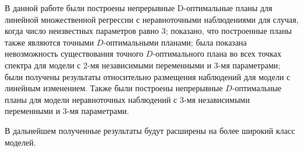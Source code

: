 В данной работе были построены непрерывные D-оптимальные планы для линейной множественной регрессии с неравноточными наблюдениями для случая, когда число неизвестных параметров равно 3; показано, что построенные планы также являются точными $D$-оптимальными планами; была показана невозможность существования точного $D$-оптимального плана во всех точках спектра для модели с 2-мя независимыми переменными и 3-мя параметрами; были получены результаты относительно размещения наблюдений для модели с линейным изменением. Также были построены непрерывные $D$-оптимальные планы для модели неравноточных наблюдений с 3-мя независимыми переменными и 3-мя параметрами.

В дальнейшем полученные результаты будут расширены на более широкий класс моделей.